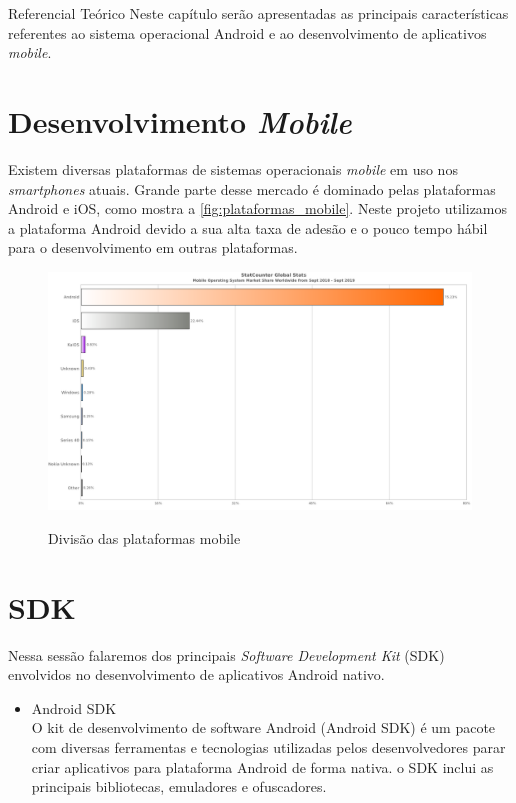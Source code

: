 \documentclass[
	12pt,				%
	openany,			%
	twoside,			%
	a4paper,			%
	english,			%
	french,				%
	spanish,			%
	brazil				%
	]{abntex2}
\begin{document}
\begin{chapter}{Referencial Teórico}
Neste capítulo serão apresentadas as principais características referentes ao sistema operacional Android e ao desenvolvimento de aplicativos \textit{mobile}.
\section{Desenvolvimento \textit{Mobile}}
Existem diversas plataformas de sistemas operacionais \textit{mobile} em uso nos \textit{smartphones} atuais. Grande parte desse mercado é dominado pelas plataformas Android e iOS, como mostra a \autoref{fig:plataformas_mobile}. Neste projeto utilizamos a plataforma Android devido a sua alta taxa de adesão e o pouco tempo hábil para o desenvolvimento em outras plataformas.

\begin{figure}[h]
\centering
   \caption{Divisão das plataformas mobile}
   \includegraphics[scale=0.4]{media/grafico_plataformas.png}
     \label{fig:plataformas_mobile}
\end{figure}

\newpage
\section{SDK}
Nessa sessão falaremos dos principais \textit{Software Development Kit} (SDK) envolvidos no desenvolvimento de aplicativos Android nativo.

\begin{itemize}
\item{Android SDK} \\
O kit de desenvolvimento de software Android (Android SDK) é um pacote com diversas ferramentas e tecnologias utilizadas pelos desenvolvedores parar criar aplicativos para plataforma Android de forma nativa. o SDK inclui as principais bibliotecas, emuladores e ofuscadores.
  

\end{itemize}
\end{chapter}
\end{document}
